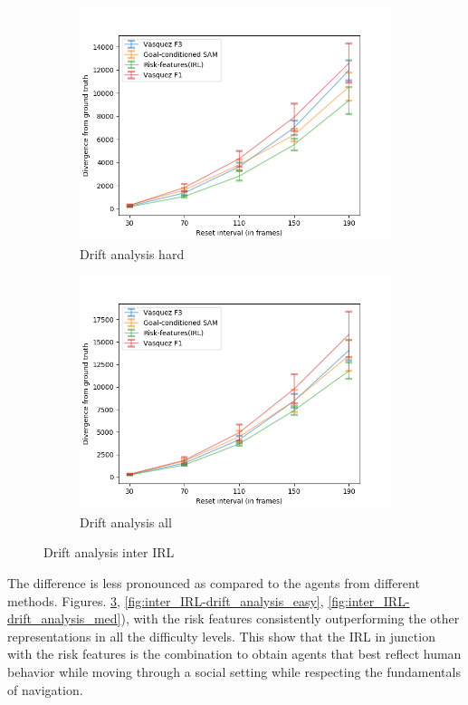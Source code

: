 \begin{figure}[htbp]
\begin{subfigure}{0.5\textwidth}
		\centering
		\includegraphics[width=\linewidth]{plots/ucy_inter_irl_new/drift_hard_ucy_inter_irl.png}
		\caption {Drift analysis hard}
		\label{fig:inter_IRL-drift_analysis_hard}
	\end{subfigure}
	\begin{subfigure}{0.5\textwidth}
		\centering
		\includegraphics[width=\linewidth]{plots/ucy_inter_irl_new/drift_all_ucy_inter_irl.png}
		\caption {Drift analysis all}
		\label{fig:inter_IRL-drift_analysis_all}
	\end{subfigure}
	\caption{Drift analysis inter IRL}
\end{figure}

The difference is less pronounced as compared to the agents from different methods. Figures. \ref{fig:inter_IRL-drift_analysis_all}, \ref{fig:inter_IRL-drift_analysis_easy}, \ref{fig:inter_IRL-drift_analysis_med}), with the risk features consistently outperforming the other representations in all the difficulty levels. This show that the IRL in junction with the risk features is the combination to obtain agents that best reflect human behavior while moving through a social setting while respecting the fundamentals of navigation.

